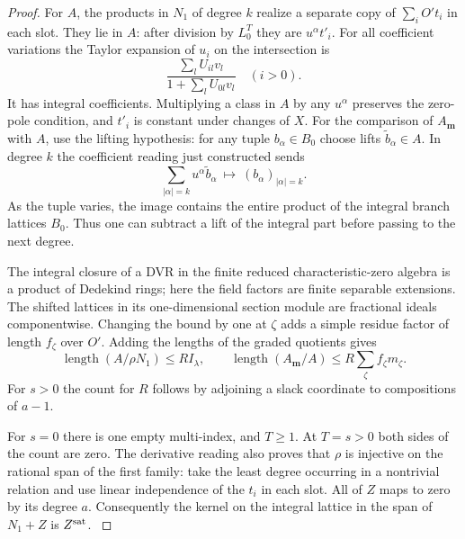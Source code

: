 \begin{proof}
For \(A\), the products
in \(N_1\) of degree \(k\) realize a separate copy of
\(\sum_i O't_i\) in each slot. They lie in \(A\): after
division by \(L_0^T\) they are \(u^\alpha t'_i\). For all
coefficient variations the Taylor expansion of \(u_i\) on
the intersection is
\[
             \frac{\sum_l U_{il}v_l}
                       {1+\sum_l U_{0l}v_l}\quad(i>0).
\]
It has integral coefficients. Multiplying a class in \(A\)
by any \(u^\alpha\) preserves the zero-pole condition, and
\(t'_i\) is constant under changes of \(X\).
For the comparison of \(A_{\boldsymbol m}\) with \(A\), use
the lifting hypothesis: for any tuple \(b_\alpha\in B_0\)
choose lifts \(\widetilde b_\alpha\in A\). In degree \(k\)
the coefficient reading just constructed sends
\[
 \sum_{|\alpha|=k}u^\alpha\widetilde b_\alpha
 \ \longmapsto\ (b_\alpha)_{|\alpha|=k}.
\]
As the tuple varies, the image contains the entire product of the
integral branch lattices \(B_0\).
Thus one can subtract a lift of the integral part before
passing to the next degree.

The integral closure of a DVR in the finite reduced
characteristic-zero algebra is a product of Dedekind rings;
here the field factors are finite separable extensions.
The shifted lattices in its one-dimensional section module
are fractional ideals componentwise. Changing the bound by
one at \(\zeta\) adds a simple residue factor of length
\(f_\zeta\) over \(O'\). Adding the lengths of the graded
quotients gives
\begin{equation}\label{eq:thick-intersection-lengths}
  \operatorname{length}(A/\rho N_1)\le R I_\lambda,\qquad
  \operatorname{length}(A_{\boldsymbol m}/A)
                        \le R\sum_\zeta f_\zeta m_\zeta .
\end{equation}
For \(s>0\) the count for \(R\) follows by adjoining a slack
coordinate to compositions of \(a-1\).

For \(s=0\) there is
one empty multi-index, and \(T\ge1\). At \(T=s>0\) both
sides of the count are zero. The derivative reading also
proves that \(\rho\) is injective on the rational span of
the first family: take the least degree occurring in a
nontrivial relation and use linear independence of the \(t_i\)
in each slot. All of \(Z\) maps to zero by its degree \(a\).
Consequently the kernel on the integral lattice in the
span of \(N_1+Z\) is \(Z^{\rm sat}\).
\label{cor:run-index-length-1}

\end{proof}

